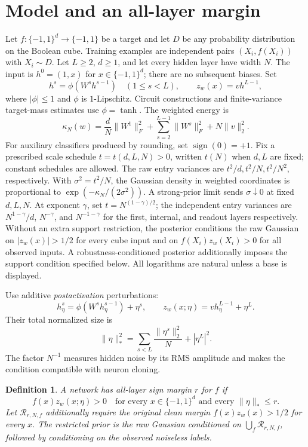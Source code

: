 \documentclass[11pt]{article}
\newtheorem{definition}[theorem]{Definition}
\newcommand{\X}{\{-1,1\}^d}
\newcommand{\sgn}{\operatorname{sign}}
\begin{document}
\section{Model and an all-layer margin}

Let $f:\X\to\{-1,1\}$ be a target and let $D$ be any probability
distribution on the Boolean cube. Training examples are independent
pairs $(X_i,f(X_i))$ with $X_i\sim D$. Let $L\ge2$, $d\ge1$,
and let every hidden layer have width $N$.
The input is $h^0=(1,x)$ for $x\in\X$; there are no subsequent biases.
Set
\[
 h^s=\phi(W^s h^{s-1})\quad(1\le s<L),\qquad
 z_w(x)=v h^{L-1},
\]
where $|\phi|\le1$ and $\phi$ is $1$-Lipschitz. Circuit constructions and
finite-variance target-mass estimates use $\phi=\tanh$. The weighted energy is
\[
 \kappa_N(w)=\frac dN\|W^1\|_F^2+
 \sum_{s=2}^{L-1}\|W^s\|_F^2+N\|v\|_2^2.
\]
For auxiliary classifiers produced by rounding, set $\sgn(0)=+1$.
Fix a prescribed scale schedule $t=t(d,L,N)>0$, written $t(N)$ when
$d,L$ are fixed; constant schedules are allowed. The raw entry variances
are $t^2/d,t^2/N,t^2/N^2$, respectively. With $\sigma^2=t^2/N$,
the Gaussian density in weighted coordinates is proportional
to $\exp(-\kappa_N/(2\sigma^2))$. A strong-prior limit sends
$\sigma\downarrow0$ at fixed $d,L,N$.
At exponent $\gamma$, set $t=N^{(1-\gamma)/2}$; the independent
entry variances are $N^{1-\gamma}/d$, $N^{-\gamma}$, and
$N^{-1-\gamma}$ for the first, internal, and readout layers respectively.
Without an extra support restriction, the posterior conditions the raw
Gaussian on $|z_w(x)|>1/2$ for every cube input and on
$f(X_i)z_w(X_i)>0$ for all observed inputs. A robustness-conditioned
posterior additionally imposes the support condition specified below.
All logarithms are natural unless a base is displayed.

Use additive \emph{postactivation} perturbations:
\[
 h^s_\eta=\phi(W^s h^{s-1}_\eta)+\eta^s,
 \qquad z_w(x;\eta)=v h^{L-1}_\eta+\eta^L.
\]
Their total normalized size is
\begin{equation}\label{eq:noisenorm}
 \|\eta\|_*^2=\sum_{s<L}\frac{\|\eta^s\|_2^2}{N}+|\eta^L|^2.
\end{equation}
The factor $N^{-1}$ measures hidden noise by its RMS amplitude and makes the
condition compatible with neuron cloning.

\begin{definition}
A network has all-layer sign margin $r$ for $f$ if
\[
 f(x)z_w(x;\eta)>0\quad\text{for every }x\in\X
 \text{ and every }\|\eta\|_*\le r.
\]
Let $\mathcal R_{r,N,f}$ additionally require the original clean margin
$f(x)z_w(x)>1/2$ for every $x$. The restricted prior is the raw Gaussian
conditioned on $\bigcup_f\mathcal R_{r,N,f}$, followed by conditioning on
the observed noiseless labels.
\end{definition}
\end{document}
